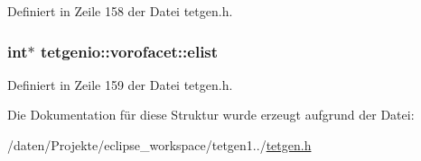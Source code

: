 Definiert in Zeile 158 der Datei tetgen.\-h.

\hypertarget{structtetgenio_1_1vorofacet_a7dc623ea5f4a6006fcc20b2bc8a1f560}{
\subsubsection[{elist}]{\setlength{\rightskip}{0pt plus 5cm}int$\ast$ tetgenio\-::vorofacet\-::elist}}\label{structtetgenio_1_1vorofacet_a7dc623ea5f4a6006fcc20b2bc8a1f560}


Definiert in Zeile 159 der Datei tetgen.\-h.



Die Dokumentation für diese Struktur wurde erzeugt aufgrund der Datei\-:\begin{DoxyCompactItemize}
\item 
/daten/\-Projekte/eclipse\-\_\-workspace/tetgen1../\hyperlink{tetgen_8h}{tetgen.\-h}\end{DoxyCompactItemize}
